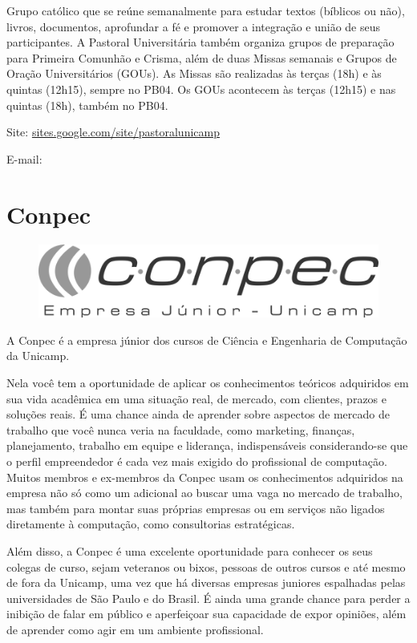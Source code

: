 Grupo católico que se reúne semanalmente para estudar textos (bíblicos ou não),
livros, documentos, aprofundar a fé e promover a integração e união de seus
participantes. A Pastoral Universitária também organiza grupos de preparação
para Primeira Comunhão e Crisma, além de duas Missas semanais e Grupos de Oração
Universitários (GOUs). As Missas são realizadas às terças (18h) e às
quintas (12h15), sempre no PB04. Os GOUs acontecem às terças (12h15) e
nas quintas (18h), também no PB04.

\begin{compactitemize}
\item Site: \url{sites.google.com/site/pastoralunicamp}
\item E-mail: 
\end{compactitemize}

\newpage
\section{Conpec}

\begin{figure}[H]
    \centering
    \includegraphics[scale=0.40]{img/conpec.png}
\end{figure}

A Conpec é a empresa júnior dos cursos de Ciência e Engenharia de Computação da
Unicamp.

Nela você tem a oportunidade de aplicar os conhecimentos teóricos
adquiridos em sua vida acadêmica em uma situação real, de mercado, com clientes,
prazos e soluções reais. É uma chance ainda de aprender sobre aspectos de mercado de trabalho que você
nunca veria na faculdade, como marketing, finanças, planejamento, trabalho em equipe e liderança,
indispensáveis considerando-se que o perfil empreendedor é cada vez mais exigido do profissional de
computação. Muitos membros e ex-membros da Conpec usam os
conhecimentos adquiridos na empresa não só como um adicional ao buscar uma vaga
no mercado de trabalho, mas também para montar suas próprias empresas ou em
serviços não ligados diretamente à computação, como consultorias estratégicas.

Além disso, a Conpec é uma excelente oportunidade para conhecer os seus colegas
de curso, sejam veteranos ou bixos, pessoas de outros cursos e até mesmo de fora da
Unicamp, uma vez que há diversas empresas juniores espalhadas pelas universidades de São Paulo e do Brasil. É ainda uma grande chance para perder a inibição de falar em
público e aperfeiçoar sua capacidade de expor opiniões, além de aprender como
agir em um ambiente profissional.

